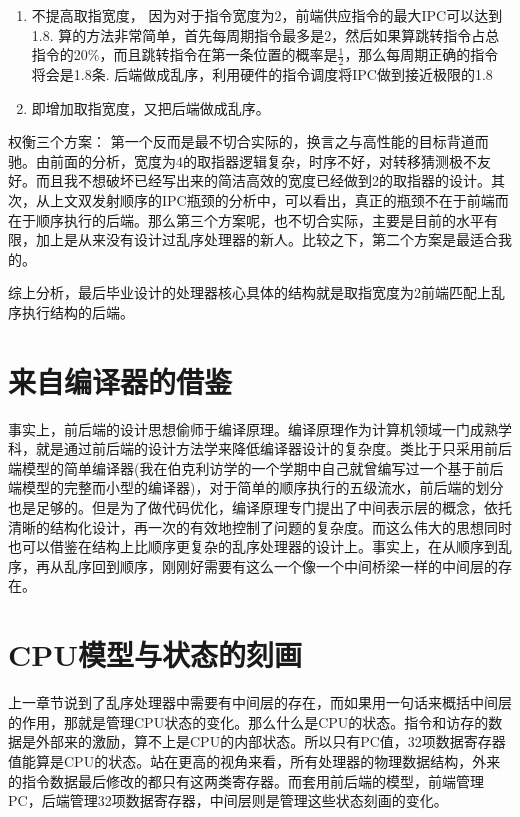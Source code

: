 \documentclass[11pt]{article}
\begin{document}
\begin{enumerate}
\begin{enumerate}
		\item 不提高取指宽度， 因为对于指令宽度为2，前端供应指令的最大IPC可以达到1.8. 算的方法非常简单，首先每周期指令最多是2，然后如果算跳转指令占总指令的20\%，而且跳转指令在第一条位置的概率是$\frac{1}{2}$，那么每周期正确的指令将会是1.8条. 后端做成乱序，利用硬件的指令调度将IPC做到接近极限的1.8
		\item 即增加取指宽度，又把后端做成乱序。
	\end{enumerate}
	权衡三个方案： 第一个反而是最不切合实际的，换言之与高性能的目标背道而驰。由前面的分析，宽度为4的取指器逻辑复杂，时序不好，对转移猜测极不友好。而且我不想破坏已经写出来的简洁高效的宽度已经做到2的取指器的设计。其次，从上文双发射顺序的IPC瓶颈的分析中，可以看出，真正的瓶颈不在于前端而在于顺序执行的后端。那么第三个方案呢，也不切合实际，主要是目前的水平有限，加上是从来没有设计过乱序处理器的新人。比较之下，第二个方案是最适合我的。
\end{enumerate}
综上分析，最后毕业设计的处理器核心具体的结构就是取指宽度为2前端匹配上乱序执行结构的后端。

\section{来自编译器的借鉴}
事实上，前后端的设计思想偷师于编译原理。编译原理作为计算机领域一门成熟学科，就是通过前后端的设计方法学来降低编译器设计的复杂度。类比于只采用前后端模型的简单编译器(我在伯克利访学的一个学期中自己就曾编写过一个基于前后端模型的完整而小型的编译器)，对于简单的顺序执行的五级流水，前后端的划分也是足够的。但是为了做代码优化，编译原理专门提出了中间表示层的概念，依托清晰的结构化设计，再一次的有效地控制了问题的复杂度。而这么伟大的思想同时也可以借鉴在结构上比顺序更复杂的乱序处理器的设计上。事实上，在从顺序到乱序，再从乱序回到顺序，刚刚好需要有这么一个像一个中间桥梁一样的中间层的存在。

\section{CPU模型与状态的刻画}
上一章节说到了乱序处理器中需要有中间层的存在，而如果用一句话来概括中间层的作用，那就是管理CPU状态的变化。那么什么是CPU的状态。指令和访存的数据是外部来的激励，算不上是CPU的内部状态。所以只有PC值，32项数据寄存器值能算是CPU的状态。站在更高的视角来看，所有处理器的物理数据结构，外来的指令数据最后修改的都只有这两类寄存器。而套用前后端的模型，前端管理PC，后端管理32项数据寄存器，中间层则是管理这些状态刻画的变化。
\end{document}

